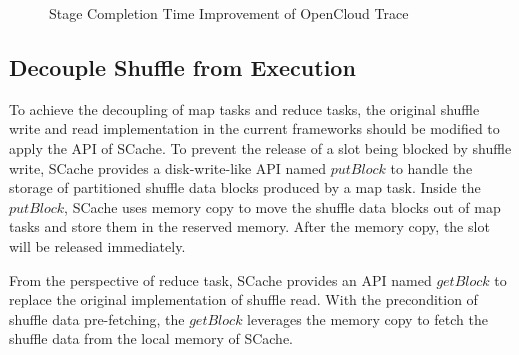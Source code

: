 \begin{figure}
\begin{minipage}{0.49\textwidth}
		\caption{Stage Completion Time Improvement of OpenCloud Trace}
		\label{fig:sim}
    \end{minipage}
\end{figure}



\subsection{Decouple Shuffle from Execution}
To achieve the decoupling of map tasks and reduce tasks, the original shuffle write and read implementation in the current frameworks should be modified to apply the API of SCache.
To prevent the release of a slot being blocked by shuffle write,  
SCache provides a disk-write-like API named $putBlock$ to handle the storage of partitioned shuffle data blocks produced by a map task.
Inside the $putBlock$, SCache uses memory copy to move the shuffle data blocks out of map tasks and store them in the reserved memory.
After the memory copy, the slot will be released immediately.

From the perspective of reduce task, SCache provides an API named $getBlock$ to replace the original implementation of shuffle read. 
With the precondition of shuffle data pre-fetching, 
the $getBlock$ leverages the memory copy to fetch the shuffle data from the local memory of SCache.
